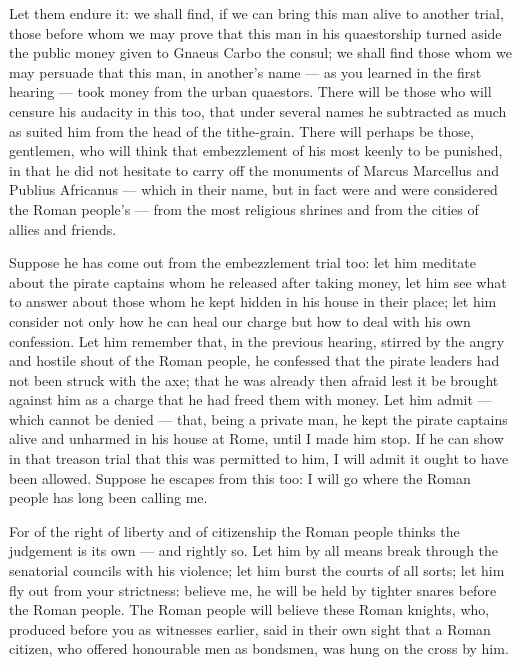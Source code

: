  Let them endure it: we shall find, if we can bring this man alive to another trial, those before whom we may prove that this man in his quaestorship turned aside the public money given to Gnaeus Carbo the consul; we shall find those whom we may persuade that this man, in another's name --- as you learned in the first hearing --- took money from the urban quaestors. There will be those who will censure his audacity in this too, that under several names he subtracted as much as suited him from the head of the tithe-grain. There will perhaps be those, gentlemen, who will think that embezzlement of his most keenly to be punished, in that he did not hesitate to carry off the monuments of Marcus Marcellus and Publius Africanus --- which in their name, but in fact were and were considered the Roman people's --- from the most religious shrines and from the cities of allies and friends.

 Suppose he has come out from the embezzlement trial too: let him meditate about the pirate captains whom he released after taking money, let him see what to answer about those whom he kept hidden in his house in their place; let him consider not only how he can heal our charge but how to deal with his own confession. Let him remember that, in the previous hearing, stirred by the angry and hostile shout of the Roman people, he confessed that the pirate leaders had not been struck with the axe; that he was already then afraid lest it be brought against him as a charge that he had freed them with money. Let him admit --- which cannot be denied --- that, being a private man, he kept the pirate captains alive and unharmed in his house at Rome, until I made him stop. If he can show in that treason trial that this was permitted to him, I will admit it ought to have been allowed. Suppose he escapes from this too: I will go where the Roman people has long been calling me.

 For of the right of liberty and of citizenship the Roman people thinks the judgement is its own --- and rightly so. Let him by all means break through the senatorial councils with his violence; let him burst the courts of all sorts; let him fly out from your strictness: believe me, he will be held by tighter snares before the Roman people. The Roman people will believe these Roman knights, who, produced before you as witnesses earlier, said in their own sight that a Roman citizen, who offered honourable men as bondsmen, was hung on the cross by him.

